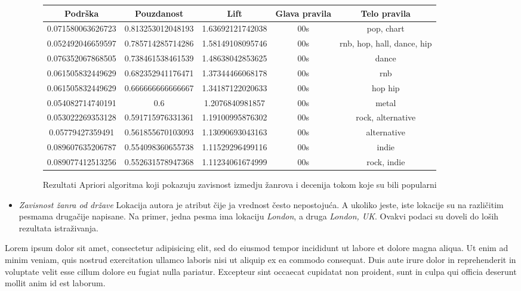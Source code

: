 \begin{itemize}
    \begin{figure}[H]
            \footnotesize
            \begin{tabular}{|c|c|c|c|c|}
                \hline
                Podr\v{s}ka & Pouzdanost & Lift & Glava pravila  & Telo pravila \\
                \hline
                0.071580063626723	& 0.813253012048193	& 1.63692121742038	& 00s   & pop, chart \\
                0.052492046659597	& 0.785714285714286	& 1.58149108095746  & 00s	& rnb, hop, hall, dance, hip \\
                0.076352067868505	& 0.738461538461539	& 1.48638042853625	& 00s	& dance \\
                0.061505832449629	& 0.682352941176471	& 1.37344466068178	& 00s   & rnb \\
                0.061505832449629	& 0.666666666666667	& 1.34187122020633	& 00s	& hop	hip \\
                0.054082714740191	& 0.6	            & 1.2076840981857	& 00s	& metal \\
                0.053022269353128	& 0.591715976331361	& 1.19100995876302	& 00s	& rock, alternative \\
                0.05779427359491	& 0.561855670103093	& 1.13090693043163	& 00s	& alternative \\
                0.089607635206787	& 0.554098360655738	& 1.11529296499116	& 00s	& indie \\
                0.089077412513256	& 0.552631578947368	& 1.11234061674999	& 00s	& rock, indie \\
                \hline
            \end{tabular}
            \label{fig:aprioriDecade}
            \caption{Rezultati Apriori algoritma koji pokazuju zavisnost izmedju \v{z}anrova i decenija tokom koje su bili popularni}
        \end{figure}
        
        
    \item \emph{Zavisnost \v{z}anra od dr\v{z}ave}
    Lokacija autora je atribut \v{c}ije ja vrednost \v{c}esto nepostoju\'c{}a. A ukoliko jeste, iste lokacije su na razli\v{c}itim pesmama druga\v{c}ije napisane. Na primer, jedna pesma ima lokaciju \emph{London}, a druga \emph{London, UK}. Ovakvi podaci su doveli do lo\v{s}ih rezultata istra\v{z}ivanja.
\end{itemize}


Lorem ipsum dolor sit amet, consectetur adipisicing elit, sed do eiusmod tempor incididunt ut labore et dolore magna aliqua. Ut enim ad minim veniam, quis nostrud exercitation ullamco laboris nisi ut aliquip ex ea commodo consequat. Duis aute irure dolor in reprehenderit in voluptate velit esse cillum dolore eu fugiat nulla pariatur. Excepteur sint occaecat cupidatat non proident, sunt in culpa qui officia deserunt mollit anim id est laborum.

